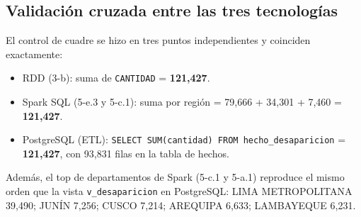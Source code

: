 \subsection{Validaci\'on cruzada entre las tres tecnolog\'ias}
El control de cuadre se hizo en tres puntos independientes y coinciden exactamente:
\begin{itemize}
  \item RDD (3-b): suma de \texttt{CANTIDAD} = \textbf{121,427}.
  \item Spark SQL (5-e.3 y 5-c.1): suma por regi\'on = 79,666 + 34,301 + 7,460 =
        \textbf{121,427}.
  \item PostgreSQL (ETL): \texttt{SELECT SUM(cantidad) FROM hecho\_desaparicion} =
        \textbf{121,427}, con 93,831 filas en la tabla de hechos.
\end{itemize}
Adem\'as, el top de departamentos de Spark (5-c.1 y 5-a.1) reproduce el mismo orden que la vista
\texttt{v\_desaparicion} en PostgreSQL: LIMA METROPOLITANA 39,490; JUN\'IN 7,256; CUSCO 7,214;
AREQUIPA 6,633; LAMBAYEQUE 6,231.
